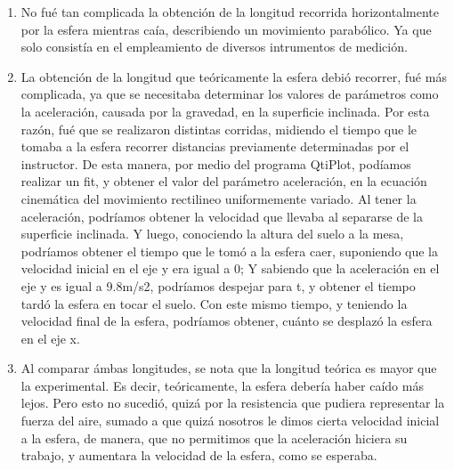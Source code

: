 \documentclass[osajnl,twocolumn,showpacs,superscriptaddress,10pt]{revtex4-1}
\begin{document}
\begin{enumerate}
\item No fué tan complicada la obtención de la longitud recorrida horizontalmente por la esfera mientras caía, describiendo un movimiento parabólico. Ya que solo consistía en el empleamiento de diversos intrumentos de medición. 
\item La obtención de la longitud que teóricamente la esfera debió recorrer, fué más complicada, ya que se necesitaba determinar los valores de parámetros como la aceleración, causada por la gravedad, en la superficie inclinada. Por esta razón, fué que se realizaron distintas corridas, midiendo el tiempo que le tomaba a la esfera recorrer distancias previamente determinadas por el instructor. De esta manera, por medio del programa QtiPlot, podíamos realizar un fit, y obtener el valor del parámetro aceleración, en la ecuación cinemática del movimiento rectilineo uniformemente variado. Al tener la aceleración, podríamos obtener la velocidad que llevaba al separarse de la superficie inclinada. Y luego, conociendo la altura del suelo a la mesa, podríamos obtener el tiempo que le tomó a la esfera caer, suponiendo que la velocidad inicial en el eje y era igual a 0; Y sabiendo que la aceleración en el eje y es igual a 9.8m/s2, podríamos despejar para t, y obtener el tiempo tardó la esfera en tocar el suelo. Con este mismo tiempo, y teniendo la velocidad final de la esfera, podríamos obtener, cuánto se desplazó la esfera en el eje x. 
\item Al comparar ámbas longitudes, se nota que la longitud teórica es mayor que la experimental. Es decir, teóricamente, la esfera debería haber caído más lejos. Pero esto no sucedió, quizá por la resistencia que pudiera representar la fuerza del aire, sumado a que quizá nosotros le dimos cierta velocidad inicial a la esfera, de manera, que no permitimos que la aceleración hiciera su trabajo, y aumentara la velocidad de la esfera, como se esperaba.
\end{enumerate}
\end{document}
